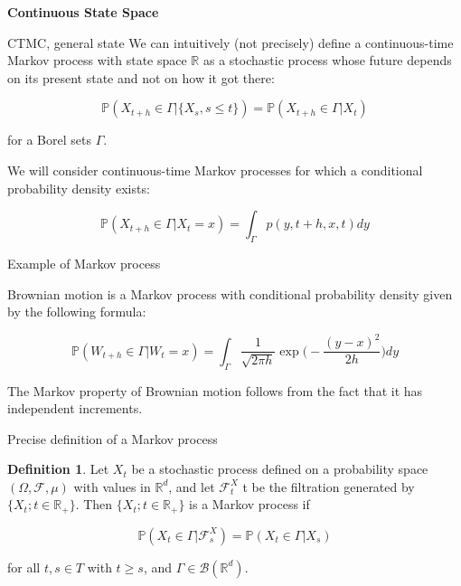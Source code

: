 \documentclass{beamer}%
\theoremstyle{definition}
\newtheorem{mydef}[theorem]{Definition}
\newcommand{\R}{\mathbb{R}}
\renewcommand{\P}{\mathbb{P}}
\begin{document}
\begin{frame}{}

\centering
\textbf{\Large Continuous State Space}

\end{frame}


\begin{frame}{CTMC, general state}
We can intuitively (not precisely) define a continuous-time Markov process with state space $\R$ as a stochastic process whose future depends on its present state and not on how it got
there:

\[\P(X_{t+h} \in \Gamma |\{X_{s}, s \leq  t\}) = \P(X_{t+h} \in \Gamma |X_{t})\]

for a Borel sets $\Gamma$.


We will consider continuous-time Markov processes for which a conditional probability density 
exists:

\[\P(X_{t+h} \in \Gamma |X_{t} = x) = \int_{\Gamma} p(y, t+h, x, t) dy\]

\end{frame}

\begin{frame}{Example of Markov process}

\begin{example}
Brownian motion is a Markov process with conditional probability
density given by the following formula:

\[\P(W_{t+h} \in \Gamma |W_{t} = x) = \int_{\Gamma} \frac{1}{\sqrt{2\pi h}} \exp\Big(-\frac{(y-x)^2}{2h}\Big)dy\]

The Markov property of Brownian motion follows from the fact that it has independent increments.
\end{example}

\end{frame}


\begin{frame}{Precise definition of a Markov process}


\begin{mydef}
Let $X_t$ be a stochastic process defined on a probability space
$(\Omega, \mathcal{F}, \mu)$ with values in $\R^d$, and let $\mathcal{F}_t^X$
t be the filtration generated by $\{X_t; t \in \mathbb{R}_+\}$.
Then $\{X_t; t \in \mathbb{R}_+\}$ is a Markov process if

\[\P(X_{t} \in \Gamma |\mathcal{F}_s^X) = \P(X_{t} \in \Gamma |X_s)\]

for all $t,s \in T$ with $t \geq s$, and $\Gamma \in \mathcal{B}(\mathbb{R}^d)$.
\end{mydef}

\end{frame}
\end{document}
